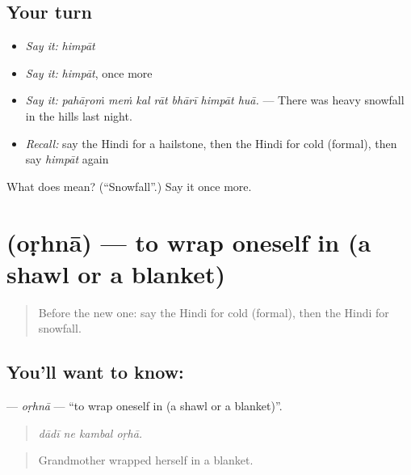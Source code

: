 \subsection*{Your turn}
\begin{itemize}
\raggedright
  \item \emph{Say it:} \emph{himpāt}
  \item \emph{Say it:} \emph{himpāt}, once more
  \item \emph{Say it:} \emph{pahāṛoṁ meṁ kal rāt bhārī himpāt huā.} — There was heavy snowfall in the hills last night.
  \item \emph{Recall:} say the Hindi for a hailstone, then the Hindi for cold (formal), then say \emph{himpāt} again
\end{itemize}

\begin{tcolorbox}[breakable,colback=teal!4,colframe=teal!35!black,title={Before you move on}]
What does  mean? (\textquotedblleft{}Snowfall\textquotedblright{}.) Say it once more.
\end{tcolorbox}
\section[\texorpdfstring{\hi{ओढ़ना} (oṛhnā)}{ओढ़ना (oṛhnā)}]{ (oṛhnā) — to wrap oneself in (a shawl or a blanket)}

\label{lesson:HI-C438-orhna}



\begin{quote}
Before the new one: say the Hindi for cold (formal), then the Hindi for snowfall.
\end{quote}

\subsection*{You'll want to know: }
\textbf{} — \emph{oṛhnā} — \textquotedblleft{}to wrap oneself in (a shawl or a blanket)\textquotedblright{}.

\begin{quote}
   
\end{quote}

\begin{quote}
\emph{dādī ne kambal oṛhā.}
\end{quote}

\begin{quote}
Grandmother wrapped herself in a blanket.
\end{quote}

